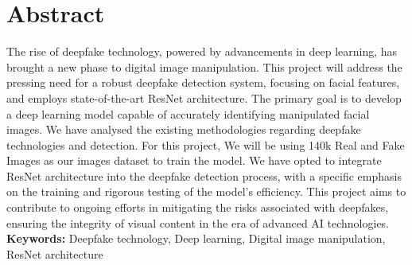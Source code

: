 \chapter*{Abstract}
The rise of deepfake technology, powered by advancements in deep learning, has brought a new phase to digital image manipulation. This project will address the pressing need for a robust deepfake detection system, focusing on facial features, and employs state-of-the-art ResNet architecture. The primary goal is to develop a deep learning model capable of accurately identifying manipulated facial images. We have analysed the existing methodologies regarding deepfake technologies and detection. For this project, We will be using 140k Real and Fake Images as our images dataset to  train the model. We have opted to integrate ResNet architecture into the deepfake detection process, with a specific emphasis on the training and rigorous testing of the model's efficiency. This project aims to contribute to ongoing efforts in mitigating the risks associated with deepfakes, ensuring the integrity of visual content in the era of advanced AI technologies.\\

\textbf{Keywords: }Deepfake technology, Deep learning, Digital image manipulation, ResNet architecture
